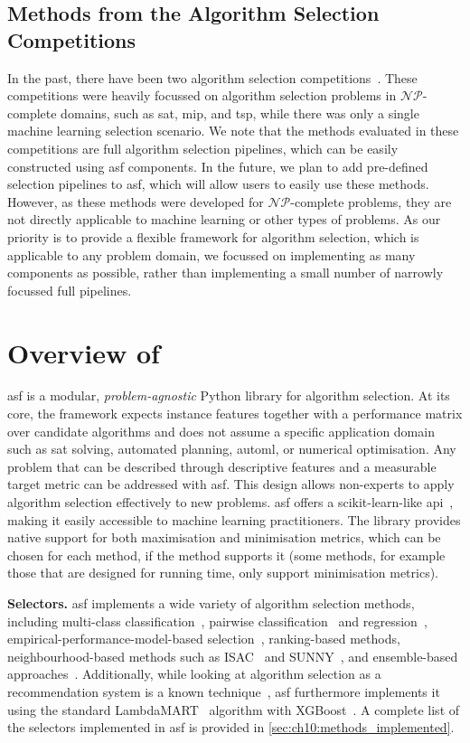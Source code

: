 \subsection{Methods from the Algorithm Selection Competitions}
In the past, there have been two algorithm selection competitions~\citep{LinEtAl19b}. These competitions were heavily focussed on algorithm selection problems in $\mathcal{NP}$-complete
domains, such as \gls{sat}, \gls{mip}, and \gls{tsp}, while there was only a single machine learning selection scenario.
We note that the methods evaluated in these competitions are full algorithm selection pipelines, which can be easily constructed using \gls{asf} components. In the future, we plan to add pre-defined selection pipelines to \gls{asf}, which will allow users to easily use these methods. However, as these methods were developed for $\mathcal{NP}$-complete problems, they are not directly applicable to machine learning or other types of problems. As our priority is to provide a flexible framework for algorithm selection, which is applicable to any problem domain, we focussed on implementing as many components as possible, rather than implementing a small number of narrowly focussed full pipelines.

\section{Overview of }
\label{sec:ch10:asf_overview}
\gls{asf} is a modular, \emph{problem-agnostic} Python library for algorithm selection.
At its core, the framework expects instance features together with a performance matrix over candidate algorithms and does not assume a specific application domain such as \gls{sat} solving, automated planning, \gls{automl}, or numerical optimisation.
Any problem that can be described through descriptive features and a measurable target metric can be addressed with \gls{asf}.
This design allows non-experts to apply algorithm selection effectively to new problems.
\gls{asf} offers a scikit-learn-like \gls{api}~\citep{PedEtAl11},
making it easily accessible to machine learning practitioners. The library provides native support for both maximisation and minimisation metrics, which can be chosen for each method, if the method supports it (some methods, for example those that are designed for running time, only support minimisation metrics).

\textbf{Selectors.}
\gls{asf} implements a wide variety of algorithm selection methods, including multi-class classification~\citep{Kotthoff13}, pairwise classification~\citep{XuEtAl12} and regression~\citep{KerEtAl18}, empirical-performance-model-based selection~\citep{XuEtAl08}, ranking-based methods, neighbourhood-based methods such as ISAC~\citep{KadEtAl10} and SUNNY~\citep{AmaEtAl14}, and ensemble-based approaches~\citep{TorEtAl23}. Additionally, while looking at algorithm selection as a recommendation system is a known technique~\citep{MisSeb17}, \gls{asf} furthermore implements it using the standard LambdaMART~\citep{Burges10} algorithm with XGBoost~\citep{CheGue16}.
A complete list of the selectors implemented in \gls{asf} is provided in \cref{sec:ch10:methods_implemented}.

